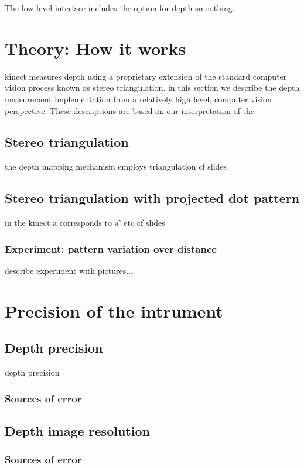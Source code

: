 The low-level interface includes the option for depth smoothing.

\section{Theory: How it works}
\label{howitworks}

kinect measures depth using a proprietary extension of the standard computer
vision process known as stereo triangulation. in this section we describe the
depth measurement implementation from a relatively high level, computer vision
perspective. These descriptions are based on our interpretation of the 

\subsection{Stereo triangulation}

the depth mapping mechanism employs triangulation
cf slides

\subsection{Stereo triangulation with projected dot pattern}

in the kinect a corresponds to a' etc
cf slides

\subsubsection{Experiment: pattern variation over distance}

describe experiment with pictures... 

\section{Precision of the intrument}
\label{precision}

\subsection{Depth precision}
depth precision

\subsubsection{Sources of error}

\subsection{Depth image resolution}

\subsubsection{Sources of error}
